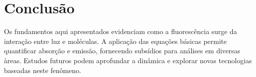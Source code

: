 \section{Conclus\~ao}
Os fundamentos aqui apresentados evidenciam como a fluoresc\^encia surge da intera\c{c}\~ao entre luz e mol\'eculas. A aplica\c{c}\~ao das equa\c{c}\~oes b\'asicas permite quantificar absor\c{c}\~ao e emiss\~ao, fornecendo subs\'idios para an\'alises em diversas \`areas. Estudos futuros podem aprofundar a din\^amica e explorar novas tecnologias baseadas neste fen\^omeno.

